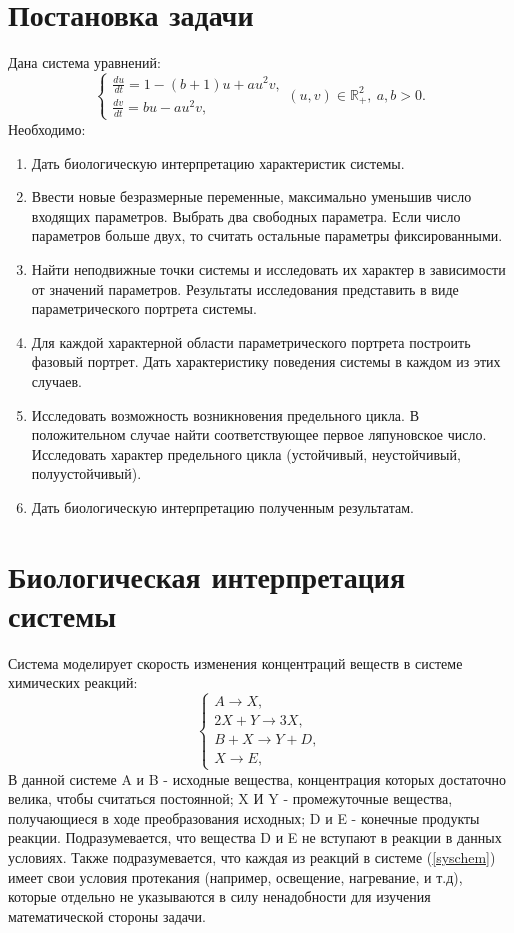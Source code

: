 \documentclass[12pt]{article}
\begin{document}
\section{Постановка задачи}
Дана система уравнений:
\begin{equation} \label{sys1}
    \begin{cases}
        \frac{du}{dt} = 1 - (b+1)u + au^2v,\\
        \frac{dv}{dt} = bu - au^2v,
    \end{cases}
    (u,v) \in \mathbb{R}^2_+, ~ a, b > 0.
\end{equation}
Необходимо:
\begin{enumerate}
    \item Дать биологическую интерпретацию характеристик системы.
    \item Ввести новые безразмерные переменные, максимально уменьшив число входящих параметров. Выбрать два свободных параметра. Если число параметров больше двух, то считать остальные параметры фиксированными.
    \item Найти неподвижные точки системы и исследовать их характер в зависимости от значений параметров. Результаты исследования представить в виде параметрического портрета системы.
    \item Для каждой характерной области параметрического портрета построить фазовый портрет. Дать характеристику поведения системы в каждом из этих случаев.
    \item Исследовать возможность возникновения предельного цикла. В положительном случае найти соответствующее первое ляпуновское число. Исследовать характер предельного цикла (устойчивый, неустойчивый, полуустойчивый).
    \item Дать биологическую интерпретацию полученным результатам.
\end{enumerate}

\newpage
\section{Биологическая интерпретация системы}
Система моделирует скорость изменения  концентраций веществ в системе химических реакций:
\begin{equation} \label{syschem}
    \begin{cases}
        A \to X, \\
        2X + Y \to 3X, \\
        B + X \to Y + D, \\
        X \to E,
    \end{cases}
\end{equation} 
В данной системе A и B - исходные вещества, концентрация которых достаточно велика, чтобы считаться постоянной; X И Y - промежуточные вещества, получающиеся в ходе преобразования исходных; D и E - конечные продукты реакции. Подразумевается, что вещества D и E не вступают в реакции в данных условиях. Также подразумевается, что каждая из реакций в системе (\ref{syschem}) имеет свои условия протекания (например, освещение, нагревание, и т.д), которые отдельно не указываются в силу ненадобности для изучения математической стороны задачи.
\end{document}
